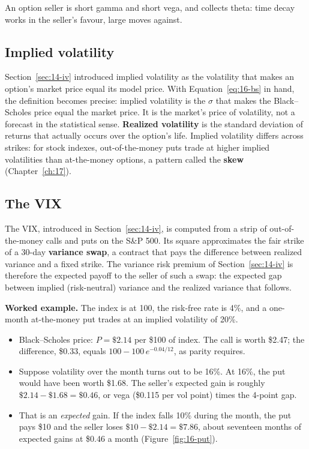 An option seller is short gamma and short vega, and collects theta: time decay works in the seller's favour, large moves against.

\subsection{Implied volatility}
\label{sec:16-iv}

Section~\ref{sec:14-iv} introduced implied volatility as the volatility that makes an option's market price equal its model price. With Equation~\eqref{eq:16-bs} in hand, the definition becomes precise: implied volatility is the $\sigma$ that makes the Black--Scholes price equal the market price. It is the market's price of volatility, not a forecast in the statistical sense. \textbf{Realized volatility} is the standard deviation of returns that actually occurs over the option's life. Implied volatility differs across strikes: for stock indexes, out-of-the-money puts trade at higher implied volatilities than at-the-money options, a pattern called the \textbf{skew} (Chapter~\ref{ch:17}).

\subsection{The VIX}

The VIX, introduced in Section~\ref{sec:14-iv}, is computed from a strip of out-of-the-money calls and puts on the S\&P 500. Its square approximates the fair strike of a 30-day \textbf{variance swap}, a contract that pays the difference between realized variance and a fixed strike. The variance risk premium of Section~\ref{sec:14-iv} is therefore the expected payoff to the seller of such a swap: the expected gap between implied (risk-neutral) variance and the realized variance that follows.

\textbf{Worked example.} The index is at 100, the risk-free rate is 4\%, and a one-month at-the-money put trades at an implied volatility of 20\%.

\begin{itemize}
  \item Black--Scholes price: $P = \$2.14$ per \$100 of index. The call is worth \$2.47; the difference, \$0.33, equals $100 - 100\,e^{-0.04/12}$, as parity requires.
  \item Suppose volatility over the month turns out to be 16\%. At 16\%, the put would have been worth \$1.68. The seller's expected gain is roughly $\$2.14 - \$1.68 = \$0.46$, or vega (\$0.115 per vol point) times the 4-point gap.
  \item That is an \emph{expected} gain. If the index falls 10\% during the month, the put pays \$10 and the seller loses $\$10 - \$2.14 = \$7.86$, about seventeen months of expected gains at \$0.46 a month (Figure~\ref{fig:16-put}).
\end{itemize}

